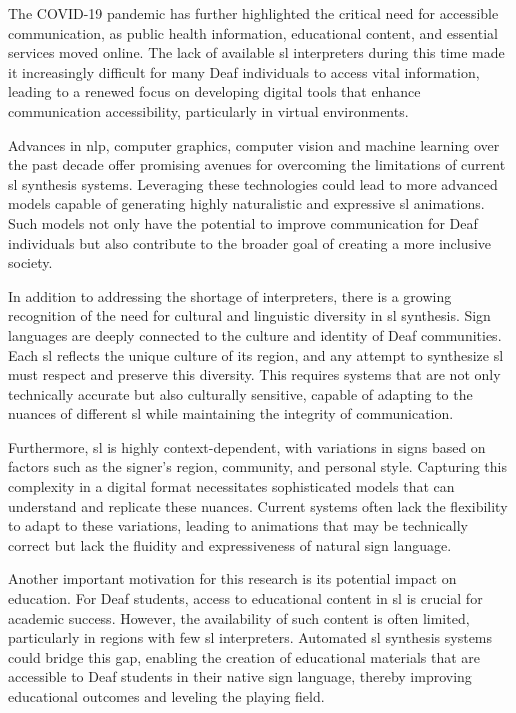 \documentclass[../../main.tex]{subfiles}
\begin{document}
The COVID-19 pandemic has further highlighted the critical need for accessible communication, as public health information, educational content, and essential services moved online. The lack of available \gls{sl} interpreters during this time made it increasingly difficult for many Deaf individuals to access vital information, leading to a renewed focus on developing digital tools that enhance communication accessibility, particularly in virtual environments.

Advances in \gls{nlp}, computer graphics, computer vision and machine learning  over the past decade offer promising avenues for overcoming the limitations of current \gls{sl} synthesis systems. Leveraging these technologies could lead to more advanced models capable of generating highly naturalistic and expressive \gls{sl} animations. Such models not only have the potential to improve communication for Deaf individuals but also contribute to the broader goal of creating a more inclusive society.

In addition to addressing the shortage of interpreters, there is a growing recognition of the need for cultural and linguistic diversity in \gls{sl} synthesis. Sign languages are deeply connected to the culture and identity of Deaf communities. Each \gls{sl} reflects the unique culture of its region, and any attempt to synthesize \gls{sl} must respect and preserve this diversity. This requires systems that are not only technically accurate but also culturally sensitive, capable of adapting to the nuances of different \gls{sl} while maintaining the integrity of communication.

Furthermore, \gls{sl} is highly context-dependent, with variations in signs based on factors such as the signer’s region, community, and personal style. Capturing this complexity in a digital format necessitates sophisticated models that can understand and replicate these nuances. Current systems often lack the flexibility to adapt to these variations, leading to animations that may be technically correct but lack the fluidity and expressiveness of natural sign language.

Another important motivation for this research is its potential impact on education. For Deaf students, access to educational content in \gls{sl} is crucial for academic success. However, the availability of such content is often limited, particularly in regions with few \gls{sl} interpreters. Automated \gls{sl} synthesis systems could bridge this gap, enabling the creation of educational materials that are accessible to Deaf students in their native sign language, thereby improving educational outcomes and leveling the playing field.
\end{document}
